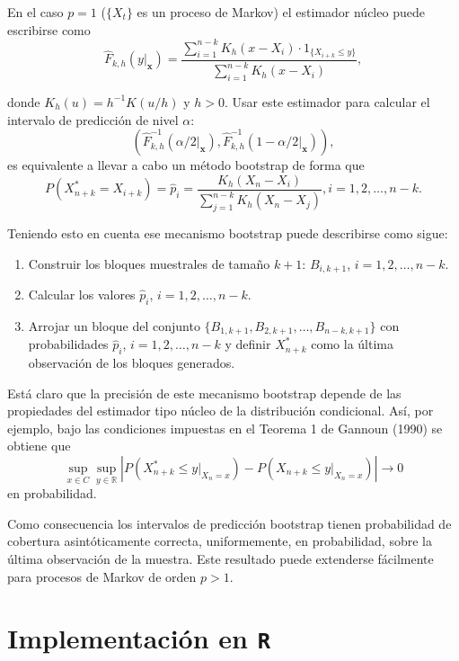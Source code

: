 \documentclass[
]{book}
\theoremstyle{break}
\theoremstyle{definition}
\theoremstyle{definition}
\theoremstyle{definition}
\theoremstyle{remark}
\begin{document}
En el caso \(p=1\) (\(\{X_{t}\}\) es un proceso de Markov) el estimador
núcleo puede escribirse como
\[\widehat{F}_{k,h}(y|_{\mathbf{x}})=\frac{\sum_{i=1}^{n-k}K_{h}(x-X_i)\cdot
1_{\{X_{i+k}\leq y\}}}{\sum_{i=1}^{n-k}K_{h}(x-X_i)},\]

donde \(K_{h}(u)=h^{-1}K(u/h)\) y \(h>0\). Usar este estimador para calcular
el intervalo de predicción de nivel \(\alpha\):
\[\left( \widehat{F}
_{k,h}^{-1}(\alpha /2|_{\mathbf{x}}),\widehat{F}_{k,h}^{-1}(1-\alpha /2|_{\mathbf{x}}) \right),\]
es equivalente a llevar a cabo un método bootstrap de forma que
\[P\left( X_{n+k}^{\ast}=X_{i+k} \right) =\widehat{p}_i=\frac{
K_{h}(X_n-X_i)}{\sum_{j=1}^{n-k}K_{h}(X_n-X_j)}\mathrm{,}
i=1,2,\ldots ,n-k.\]

Teniendo esto en cuenta ese mecanismo bootstrap puede describirse como
sigue:

\begin{enumerate}
\def\labelenumi{\arabic{enumi}.}
\item
  Construir los bloques muestrales de tamaño \(k+1\): \(B_{i,k+1}\),
  \(i=1,2,\ldots ,n-k\).
\item
  Calcular los valores \(\widehat{p}_i\), \(i=1,2,\ldots ,n-k\).
\item
  Arrojar un bloque del conjunto \(\{B_{1,k+1},B_{2,k+1},\ldots ,B_{n-k,k+1}\}\) con probabilidades \(\widehat{p}_i\),
  \(i=1,2,\ldots ,n-k\) y definir \(X_{n+k}^{\ast}\) como la última
  observación de los bloques generados.
\end{enumerate}

Está claro que la precisión de este mecanismo bootstrap depende de las
propiedades del estimador tipo núcleo de la distribución condicional.
Así, por ejemplo, bajo las condiciones impuestas en el Teorema 1 de
Gannoun (1990) se obtiene que
\[\sup_{x\in C}\sup_{y\in \mathbb{R}}\left\vert P\left( X_{n+k}^{\ast}\leq
y|_{X_n=x} \right) -P\left( X_{n+k}\leq y|_{X_n=x} \right) \right\vert
\rightarrow 0\]
en probabilidad.

Como consecuencia los intervalos de predicción bootstrap tienen
probabilidad de cobertura asintóticamente correcta, uniformemente, en
probabilidad, sobre la última observación de la muestra. Este resultado
puede extenderse fácilmente para procesos de Markov de orden
\(p>1\).

\hypertarget{implementaciuxf3n-en-r}{%
\section{\texorpdfstring{Implementación en \texttt{R}}{Implementación en R}}\label{implementaciuxf3n-en-r}}
\end{document}
